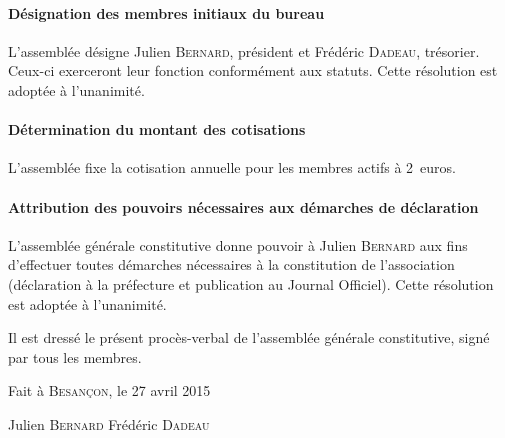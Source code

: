 \documentclass{article}
\begin{document}
\paragraph{Désignation des membres initiaux du bureau}

L'assemblée désigne Julien \textsc{Bernard}, président et Frédéric \textsc{Dadeau}, trésorier. Ceux-ci exerceront leur fonction conformément aux statuts. Cette résolution est adoptée à l'unanimité.

\paragraph{Détermination du montant des cotisations}

L'assemblée fixe la cotisation annuelle pour les membres actifs à 2~euros.

\paragraph{Attribution des pouvoirs nécessaires aux démarches de déclaration}

L'assemblée générale constitutive donne pouvoir à Julien \textsc{Bernard} aux fins d'effectuer toutes démarches nécessaires à la constitution de l'association (déclaration à la préfecture et publication au Journal Officiel). Cette résolution est adoptée à l'unanimité.

Il est dressé le présent procès-verbal de l'assemblée générale constitutive, signé par tous les membres.

\bigskip

\begin{flushright}
Fait à \textsc{Besançon}, le 27 avril 2015
\end{flushright}

\begin{center}
Julien \textsc{Bernard} \hspace{5em} Frédéric \textsc{Dadeau}
\end{center}
\end{document}
